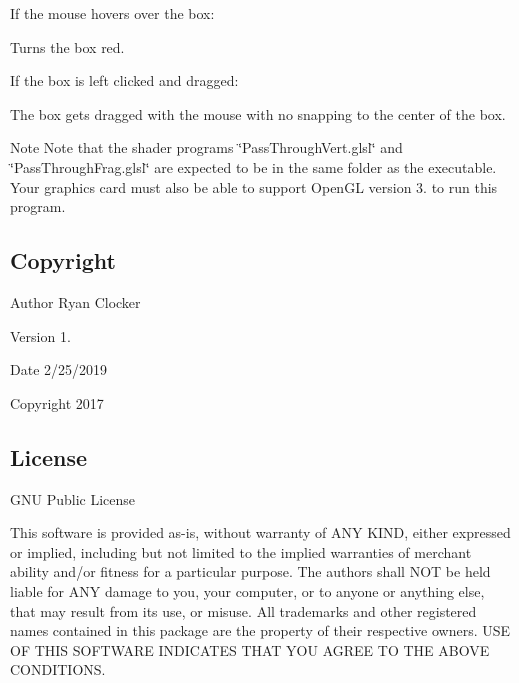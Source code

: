 If the mouse hovers over the box\+:
\begin{DoxyItemize}
\item Turns the box red.
\end{DoxyItemize}

If the box is left clicked and dragged\+:
\begin{DoxyItemize}
\item The box gets dragged with the mouse with no snapping to the center of the box.
\end{DoxyItemize}

\begin{DoxyNote}{Note}
Note that the shader programs \char`\"{}\+Pass\+Through\+Vert.\+glsl\char`\"{} and \char`\"{}\+Pass\+Through\+Frag.\+glsl\char`\"{} are expected to be in the same folder as the executable. Your graphics card must also be able to support Open\+GL version 3. to run this program.
\end{DoxyNote}


\hypertarget{index_copyright}{}\subsection{Copyright}\label{index_copyright}
\begin{DoxyAuthor}{Author}
Ryan Clocker 
\end{DoxyAuthor}
\begin{DoxyVersion}{Version}
1. 
\end{DoxyVersion}
\begin{DoxyDate}{Date}
2/25/2019 
\end{DoxyDate}
\begin{DoxyCopyright}{Copyright}
2017
\end{DoxyCopyright}


\hypertarget{index_license}{}\subsection{License}\label{index_license}
G\+NU Public License

This software is provided as-\/is, without warranty of A\+NY K\+I\+ND, either expressed or implied, including but not limited to the implied warranties of merchant ability and/or fitness for a particular purpose. The authors shall N\+OT be held liable for A\+NY damage to you, your computer, or to anyone or anything else, that may result from its use, or misuse. All trademarks and other registered names contained in this package are the property of their respective owners. U\+SE OF T\+H\+IS S\+O\+F\+T\+W\+A\+RE I\+N\+D\+I\+C\+A\+T\+ES T\+H\+AT Y\+OU A\+G\+R\+EE TO T\+HE A\+B\+O\+VE C\+O\+N\+D\+I\+T\+I\+O\+NS. 
